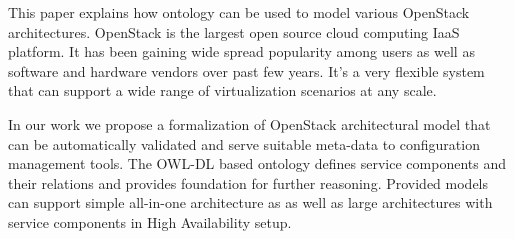 
This paper explains how ontology can be used to model various OpenStack architectures. OpenStack is the largest open source cloud computing IaaS platform. It has been gaining wide spread popularity among users as well as software and hardware vendors over past few years. It's a very flexible system that can support a wide range of virtualization scenarios at any scale.

In our work we propose a formalization of OpenStack architectural model that can be automatically validated and serve suitable meta-data to configuration management tools. The OWL-DL based ontology defines service components and their relations and  provides foundation for further reasoning. Provided models can support simple all-in-one architecture as as well as large architectures with service components in High Availability setup.